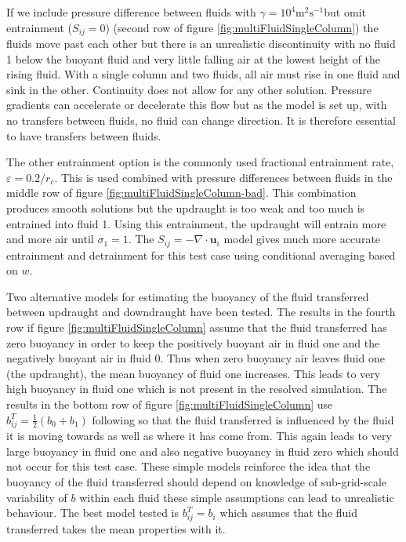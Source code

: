 \documentclass[draft]{agujournal2019}
\begin{document}
If we include pressure difference between fluids with $\gamma=10^{4}\text{m}^{2}\text{s}^{-1}$but
omit entrainment ($S_{ij}=0$) (second row of figure \ref{fig:multiFluidSingleColumn})
the fluids move past each other but there is an unrealistic discontinuity
with no fluid 1 below the buoyant fluid and very little falling air
at the lowest height of the rising fluid. With a single column and
two fluids, all air must rise in one fluid and sink in the other.
Continuity does not allow for any other solution. Pressure gradients
can accelerate or decelerate this flow but as the model is set up,
with no transfers between fluids, no fluid can change direction. It
is therefore essential to have transfers between fluids.

The other entrainment option is the commonly used fractional entrainment
rate, $\varepsilon=0.2/r_{c}$. This is used combined with pressure
differences between fluids in the middle row of figure \ref{fig:multiFluidSingleColumn-bad}.
This combination produces smooth solutions but the updraught is too
weak and too much is entrained into fluid 1. Using this entrainment,
the updraught will entrain more and more air until $\sigma_{1}=1$.
The $S_{ij}=-\nabla\cdot\mathbf{u}_{i}$ model gives much more accurate
entrainment and detrainment for this test case using conditional averaging
based on $w$.

Two alternative models for estimating the buoyancy of the fluid transferred
between updraught and downdraught have been tested. The results in
the fourth row if figure \ref{fig:multiFluidSingleColumn} assume
that the fluid transferred has zero buoyancy in order to keep the
positively buoyant air in fluid one and the negatively buoyant air
in fluid 0. Thus when zero buoyancy air leaves fluid one (the updraught),
the mean buoyancy of fluid one increases. This leads to very high
buoyancy in fluid one which is not present in the resolved simulation.
The results in the bottom row of figure \ref{fig:multiFluidSingleColumn}
use $b_{ij}^{T}=\frac{1}{2}\left(b_{0}+b_{1}\right)$ following 
so that the fluid transferred is influenced by the fluid it is moving
towards as well as where it has come from. This again leads to very
large buoyancy in fluid one and also negative buoyancy in fluid zero
which should not occur for this test case. These simple models reinforce
the idea that the buoyancy of the fluid transferred should depend
on knowledge of sub-grid-scale variability of $b$ within each fluid
\textendash{} these simple assumptions can lead to unrealistic behaviour.
The best model tested is $b_{ij}^{T}=b_{i}$ which assumes that the
fluid transferred takes the mean properties with it.
\end{document}
